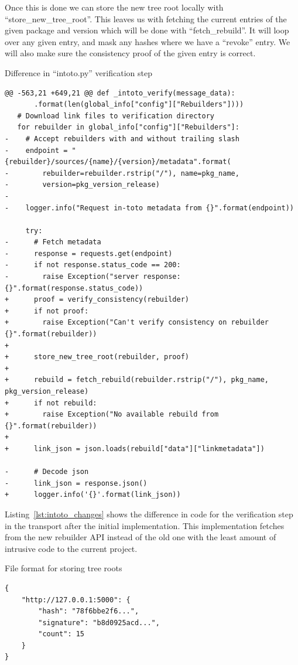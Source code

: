 \documentclass[../Main/thesis.tex]{subfiles}
\begin{document}
Once this is done we can store the new tree root locally with
``store\_new\_tree\_root''. This leaves us with fetching the current entries of
the given package and version which will be done with ``fetch\_rebuild''. It
will loop over any given entry, and mask any hashes where we have a ``revoke''
entry. We will also make sure the consistency proof of the given entry is
correct.

\begin{listing}[H]
\caption{Difference in ``intoto.py'' verification step}
\label{lst:intoto_changes}
\begin{verbatim}
@@ -563,21 +649,21 @@ def _intoto_verify(message_data):
       .format(len(global_info["config"]["Rebuilders"])))
   # Download link files to verification directory
   for rebuilder in global_info["config"]["Rebuilders"]:
-    # Accept rebuilders with and without trailing slash
-    endpoint = "{rebuilder}/sources/{name}/{version}/metadata".format(
-        rebuilder=rebuilder.rstrip("/"), name=pkg_name,
-        version=pkg_version_release)
-
-    logger.info("Request in-toto metadata from {}".format(endpoint))
 
     try:
-      # Fetch metadata
-      response = requests.get(endpoint)
-      if not response.status_code == 200:
-        raise Exception("server response: {}".format(response.status_code))
+      proof = verify_consistency(rebuilder)
+      if not proof:
+        raise Exception("Can't verify consistency on rebuilder {}".format(rebuilder))
+
+      store_new_tree_root(rebuilder, proof)
+
+      rebuild = fetch_rebuild(rebuilder.rstrip("/"), pkg_name, pkg_version_release)
+      if not rebuild:
+        raise Exception("No available rebuild from {}".format(rebuilder))
+
+      link_json = json.loads(rebuild["data"]["linkmetadata"])
 
-      # Decode json
-      link_json = response.json()
+      logger.info('{}'.format(link_json))
\end{verbatim}
\end{listing}

Listing~\ref{lst:intoto_changes} shows the difference in code for the
verification step in the transport after the initial implementation. This
implementation fetches from the new rebuilder API instead of the old one with
the least amount of intrusive code to the current project.

\begin{listing}[H]
\caption{File format for storing tree roots}
\label{lst:tree_root_store}
\begin{verbatim}
{
    "http://127.0.0.1:5000": {
        "hash": "78f6bbe2f6...",
        "signature": "b8d0925acd...",
        "count": 15
    }
}
\end{verbatim}
\end{listing}
\end{document}
